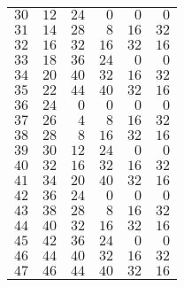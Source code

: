 \documentclass[a4paper]{scrartcl}
\begin{document}
\begin{tabular}{rrrrrr}
$30$ & $12$ & $24$ & $0$ & $0$ & $0$ \\
$31$ & $14$ & $28$ & $8$ & $16$ & $32$ \\
$32$ & $16$ & $32$ & $16$ & $32$ & $16$ \\
$33$ & $18$ & $36$ & $24$ & $0$ & $0$ \\
$34$ & $20$ & $40$ & $32$ & $16$ & $32$ \\
$35$ & $22$ & $44$ & $40$ & $32$ & $16$ \\
$36$ & $24$ & $0$ & $0$ & $0$ & $0$ \\
$37$ & $26$ & $4$ & $8$ & $16$ & $32$ \\
$38$ & $28$ & $8$ & $16$ & $32$ & $16$ \\
$39$ & $30$ & $12$ & $24$ & $0$ & $0$ \\
$40$ & $32$ & $16$ & $32$ & $16$ & $32$ \\
$41$ & $34$ & $20$ & $40$ & $32$ & $16$ \\
$42$ & $36$ & $24$ & $0$ & $0$ & $0$ \\
$43$ & $38$ & $28$ & $8$ & $16$ & $32$ \\
$44$ & $40$ & $32$ & $16$ & $32$ & $16$ \\
$45$ & $42$ & $36$ & $24$ & $0$ & $0$ \\
$46$ & $44$ & $40$ & $32$ & $16$ & $32$ \\
$47$ & $46$ & $44$ & $40$ & $32$ & $16$ \\
\bottomrule
\end{tabular}
\end{document}
